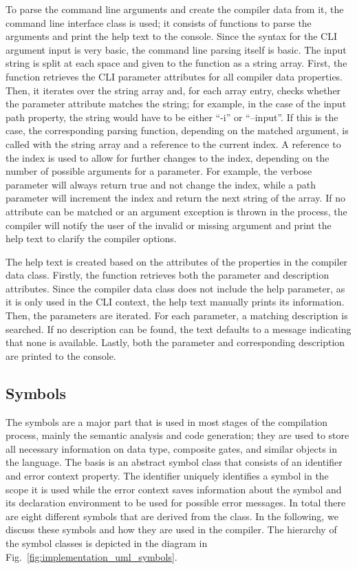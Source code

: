 To parse the command line arguments and create the compiler data from it, the command line interface class is used; it consists of functions to parse the arguments and print the help text to the console. Since the syntax for the CLI argument input is very basic, the command line parsing itself is basic. The input string is split at each space and given to the function as a string array. First, the function retrieves the CLI parameter attributes for all compiler data properties. Then, it iterates over the string array and, for each array entry, checks whether the parameter attribute matches the string; for example, in the case of the input path property, the string would have to be either ``-i'' or ``--input''. If this is the case, the corresponding parsing function, depending on the matched argument, is called with the string array and a reference to the current index. A reference to the index is used to allow for further changes to the index, depending on the number of possible arguments for a parameter. For example, the verbose parameter will always return true and not change the index, while a path parameter will increment the index and return the next string of the array. If no attribute can be matched or an argument exception is thrown in the process, the compiler will notify the user of the invalid or missing argument and print the help text to clarify the compiler options.

The help text is created based on the attributes of the properties in the compiler data class. Firstly, the function retrieves both the parameter and description attributes. Since the compiler data class does not include the help parameter, as it is only used in the CLI context, the help text manually prints its information. Then, the parameters are iterated. For each parameter, a matching description is searched. If no description can be found, the text defaults to a message indicating that none is available. Lastly, both the parameter and corresponding description are printed to the console.

\subsection{Symbols}
\label{sec:implementation_symbols}
The symbols are a major part that is used in most stages of the compilation process, mainly the semantic analysis and code generation; they are used to store all necessary information on data type, composite gates, and similar objects in the language. The basis is an abstract symbol class that consists of an identifier and error context property. The identifier uniquely identifies a symbol in the scope it is used while the error context saves information about the symbol and its declaration environment to be used for possible error messages. In total there are eight different symbols that are derived from the class. In the following, we discuss these symbols and how they are used in the compiler. The hierarchy of the symbol classes is depicted in the diagram in Fig.~\ref{fig:implementation_uml_symbols}.


